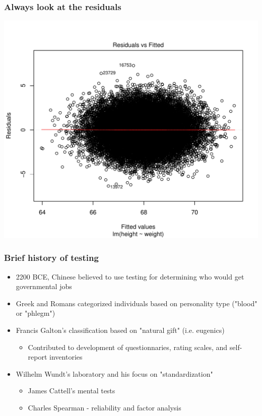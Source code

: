 \documentclass[dvipsnames]{beamer}\usepackage[]{graphicx}\usepackage[]{color}
\makeatletter
\def\maxwidth{ %
  \ifdim\Gin@nat@width>\linewidth
    \linewidth
  \else
    \Gin@nat@width
  \fi
}
\newenvironment{knitrout}{}{} %
\makeatother
\begin{document}
\begin{frame}
\frametitle{Always look at the residuals}
\begin{knitrout}
\color{fgcolor}

{\centering \includegraphics[width=\maxwidth]{figure/unnamed-chunk-16-1} 

}



\end{knitrout}
\end{frame}

\begin{frame}
\frametitle{Brief history of testing}
\begin{itemize}
\item 2200 BCE, Chinese believed to use testing for determining who would get governmental jobs
\item Greek and Romans categorized individuals based on personality type ("blood" or "phlegm")
\item Francis Galton's classification based on "natural gift" (i.e. eugenics)
\begin{itemize}
\item Contributed to development of questionnaries, rating scales, and self-report inventories
\end{itemize}
\item Wilhelm Wundt's laboratory and his focus on "standardization"
\begin{itemize}
\item James Cattell's mental tests
\item Charles Spearman - reliability and factor analysis
\end{itemize}
\end{itemize}
\end{frame}
\end{document}
